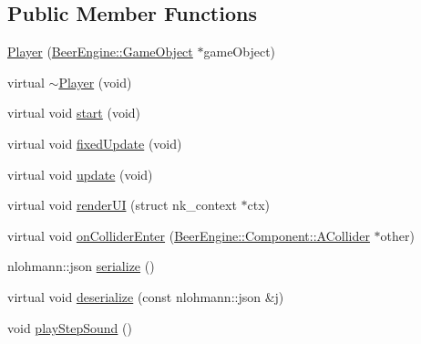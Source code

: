 \subsection*{Public Member Functions}
\begin{DoxyCompactItemize}
\item 
\mbox{\hyperlink{class_game_1_1_component_1_1_player_a3568c25cf29f9931ed2c07208c98ee30}{Player}} (\mbox{\hyperlink{class_beer_engine_1_1_game_object}{Beer\+Engine\+::\+Game\+Object}} $\ast$game\+Object)
\item 
virtual \mbox{\hyperlink{class_game_1_1_component_1_1_player_ad2c9c1cfbbbd0187fb8df8f6d7e4010f}{$\sim$\+Player}} (void)
\item 
virtual void \mbox{\hyperlink{class_game_1_1_component_1_1_player_a317e5d073713ea27ceffe5de642240a6}{start}} (void)
\item 
virtual void \mbox{\hyperlink{class_game_1_1_component_1_1_player_aacbb2bc974b4b81434abd49eb8f91999}{fixed\+Update}} (void)
\item 
virtual void \mbox{\hyperlink{class_game_1_1_component_1_1_player_a52212c267395699de71b77e88b93032d}{update}} (void)
\item 
virtual void \mbox{\hyperlink{class_game_1_1_component_1_1_player_a5d5f837406a8e9f62dbe2c83ab3751b6}{render\+UI}} (struct nk\+\_\+context $\ast$ctx)
\item 
virtual void \mbox{\hyperlink{class_game_1_1_component_1_1_player_a68981bff23caf1fa65ea9a9007265b54}{on\+Collider\+Enter}} (\mbox{\hyperlink{class_beer_engine_1_1_component_1_1_a_collider}{Beer\+Engine\+::\+Component\+::\+A\+Collider}} $\ast$other)
\item 
nlohmann\+::json \mbox{\hyperlink{class_game_1_1_component_1_1_player_a164f1424c0ff3d603ee60301e0aee6a7}{serialize}} ()
\item 
virtual void \mbox{\hyperlink{class_game_1_1_component_1_1_player_a448003673bc03c81447887b9a6d38084}{deserialize}} (const nlohmann\+::json \&j)
\item 
void \mbox{\hyperlink{class_game_1_1_component_1_1_player_a87921f894ec75727bb1d83aa660573d1}{play\+Step\+Sound}} ()
\end{DoxyCompactItemize}
